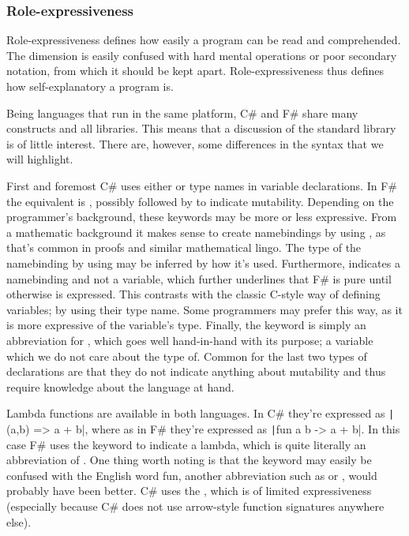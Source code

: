 \subsubsection{Role-expressiveness}
Role-expressiveness defines how easily a program can be read and comprehended. The dimension is easily confused with hard mental operations or poor secondary notation, from which it should be kept apart\cite{green1996usability}. Role-expressiveness thus defines how self-explanatory a program is.

Being languages that run in the same platform, C\# and F\# share many constructs and all libraries. This means that a discussion of the standard library is of little interest. There are, however, some differences in the syntax that we will highlight. 

First and foremost C\# uses either  or type names in variable declarations. In F\# the equivalent is , possibly followed by  to indicate mutability. Depending on the programmer's background, these keywords may be more or less expressive. From a mathematic background it makes sense to create namebindings by using , as that's common in proofs and similar mathematical lingo. The type of the namebinding by using  may be inferred by how it's used. Furthermore,  indicates a namebinding and not a variable, which further underlines that F\# is pure until otherwise is expressed. This contrasts with the classic C-style way of defining variables; by using their type name. Some programmers may prefer this way, as it is more expressive of the variable's type. Finally, the  keyword is simply an abbreviation for , which goes well hand-in-hand with its purpose; a variable which we do not care about the type of. Common for the last two types of declarations are that they do not indicate anything about mutability and thus require knowledge about the language at hand.

Lambda functions are available in both languages. In C\# they're expressed as \texttt|(a,b) => a + b|, where as in F\# they're expressed as \texttt|fun a b -> a + b|. In this case F\# uses the keyword  to indicate a lambda, which is quite literally an abbreviation of . One thing worth noting is that the  keyword may easily be confused with the English word fun, another abbreviation such as  or , would probably have been better. C\# uses the \ttt{=\textgreater}, which is of limited expressiveness (especially because C\# does not use arrow-style function signatures anywhere else).

